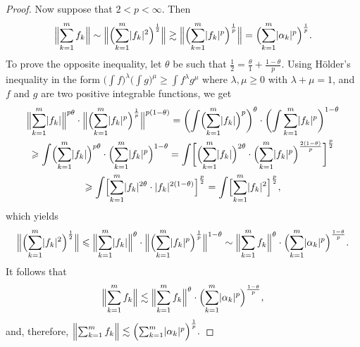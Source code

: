 \documentclass[12pt]{amsart}
\theoremstyle{plain}
\theoremstyle{definition}
\newcommand{\abs}[1]{\lvert#1\rvert}
\newcommand{\Bignorm}[1]{\Bigl\lVert#1\Bigr\rVert}
\renewcommand{\le}{\leqslant}
\renewcommand{\ge}{\geqslant}
\begin{document}
\begin{proof}
  Now suppose that $2<p<\infty$. Then
  \begin{displaymath}
    \Bignorm{\sum_{k=1}^mf_k}
    \sim\Bignorm{\Bigl(\sum_{k=1}^m\abs{f_k}^2\Bigr)^\frac12}
    \gtrsim\Bignorm{\Bigl(\sum_{k=1}^m\abs{f_k}^p\Bigr)^\frac1p}
    =\Bigl(\sum_{k=1}^m\abs{\alpha_k}^p\Bigr)^\frac1p.
  \end{displaymath}
  To prove the opposite inequality, let $\theta$ be such that
  \begin{math}
    \frac12=\frac{\theta}{1}+\frac{1-\theta}{p}.
  \end{math}
  Using H\"older's inequality in the form
  \begin{math}
    \bigl(\int f\bigr)^\lambda\bigl(\int g)^\mu
    \ge\int f^\lambda g^\mu
  \end{math}
  where $\lambda,\mu\ge 0$ with $\lambda+\mu=1$, and 
  $f$ and $g$ are two positive integrable functions, we get
  \begin{multline*}
    \Bignorm{\sum_{k=1}^m\abs{f_k}}^{p\theta}\cdot
    \Bignorm{\Bigl(\sum_{k=1}^m\abs{f_k}^p\Bigr)^\frac1p}
      ^{p(1-\theta)}
      =\biggl(\int\Bigl(\sum_{k=1}^m\abs{f_k}\Bigr)^p\biggr)^\theta
      \cdot\biggl(\int\sum_{k=1}^m\abs{f_k}^p\biggr)^{1-\theta}\\
      \ge\int\Bigl(\sum_{k=1}^m\abs{f_k}\Bigr)^{p\theta}\cdot
      \Bigl(\sum_{k=1}^m\abs{f_k}^p\Bigr)^{1-\theta}
      =\int\biggl[\Bigl(\sum_{k=1}^m\abs{f_k}\Bigr)^{2\theta}\cdot
      \Bigl(\sum_{k=1}^m\abs{f_k}^p\Bigr)^{\frac{2(1-\theta)}{p}}\biggr]
      ^{\frac{p}{2}}\\
      \ge\int\Bigl[\sum_{k=1}^m\abs{f_k}^{2\theta}\cdot
      \abs{f_k}^{2(1-\theta)}\Bigr]^{\frac{p}{2}}
      =\int\Bigl[\sum_{k=1}^m\abs{f_k}^2\Bigr]^\frac{p}{2},
  \end{multline*}
  which yields
  \begin{displaymath}
    \Bignorm{\Bigl(\sum_{k=1}^m\abs{f_k}^2\Bigr)^{\frac12}}
    \le\Bignorm{\sum_{k=1}^m\abs{f_k}}^{\theta}\cdot
    \Bignorm{\Bigl(\sum_{k=1}^m\abs{f_k}^p\Bigr)^\frac1p}
    ^{1-\theta}
    \sim\Bignorm{\sum_{k=1}^m f_k}^{\theta}\cdot
    \Bigl(\sum_{k=1}^m\abs{\alpha_k}^p\Bigr)
    ^{\frac{1-\theta}{p}}.
  \end{displaymath}
  It follows that
  \begin{displaymath}
    \Bignorm{\sum_{k=1}^m f_k}\lesssim
    \Bignorm{\sum_{k=1}^m f_k}^{\theta}\cdot
    \Bigl(\sum_{k=1}^m\abs{\alpha_k}^p\Bigr)
    ^{\frac{1-\theta}{p}},
  \end{displaymath}
  and, therefore,
  \begin{math}
    \Bignorm{\sum_{k=1}^m f_k}\lesssim
        \Bigl(\sum_{k=1}^m\abs{\alpha_k}^p\Bigr)
    ^{\frac{1}{p}}.
  \end{math}
\end{proof}
\end{document}
